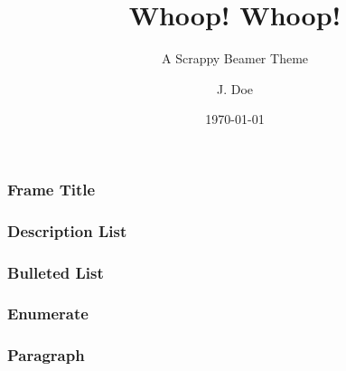 \documentclass[aspectratio=169,9pt]{beamer}
\title{Whoop! Whoop!}
\subtitle{A Scrappy Beamer Theme}
\date{\today}
\author{J. Doe}
\institute{Ministry of Silly Walks}
\begin{document}
\maketitle

\begin{frame}
  \frametitle{Frame Title}
  \blindmathtrue
  \blindtext
\end{frame}
\begin{frame}
  \frametitle{Description List}
  \blinddescription[5]
\end{frame}
\begin{frame}
  \frametitle{Bulleted List}
  \blinditemize[3]
\end{frame}
\begin{frame}
  \frametitle{Enumerate}
  \blindenumerate[7]
\end{frame}
\begin{frame}
  \frametitle{Paragraph}
  \blindtext
\end{frame}
\end{document}

